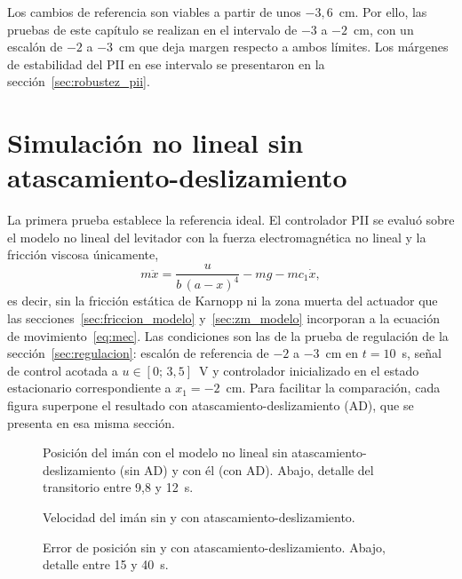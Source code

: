 Los cambios de referencia son viables a partir de unos $-3{,}6$~cm. Por ello, las pruebas de este capítulo se realizan en el intervalo de $-3$ a $-2$~cm, con un escalón de $-2$ a $-3$~cm que deja margen respecto a ambos límites. Los márgenes de estabilidad del PII en ese intervalo se presentaron en la sección~\ref{sec:robustez_pii}.

\section{Simulación no lineal sin atascamiento-deslizamiento}

La primera prueba establece la referencia ideal. El controlador PII se evaluó sobre el modelo no lineal del levitador con la fuerza electromagnética no lineal y la fricción viscosa únicamente,
\begin{equation}
m\ddot{x} = \frac{u}{b\,(a-x)^4} - m g - m c_1 \dot{x} ,
\label{eq:nl_sin_ad}
\end{equation}
es decir, sin la fricción estática de Karnopp ni la zona muerta del actuador que las secciones~\ref{sec:friccion_modelo} y~\ref{sec:zm_modelo} incorporan a la ecuación de movimiento~\eqref{eq:mec}. Las condiciones son las de la prueba de regulación de la sección~\ref{sec:regulacion}: escalón de referencia de $-2$ a $-3$~cm en $t=10$~s, señal de control acotada a $u\in[0;\,3{,}5]$~V y controlador inicializado en el estado estacionario correspondiente a $x_1=-2$~cm. Para facilitar la comparación, cada figura superpone el resultado con atascamiento-deslizamiento (AD), que se presenta en esa misma sección.

\begin{figure}[ht]
    \centering
    
    \caption[Sin AD: posición]{Posición del imán con el modelo no lineal sin atascamiento-deslizamiento (sin AD) y con él (con AD). Abajo, detalle del transitorio entre 9,8 y 12~s.}
    \label{fig:sinad_pos}
\end{figure}

\begin{figure}[ht]
    \centering
    
    \caption[Sin AD: velocidad]{Velocidad del imán sin y con atascamiento-deslizamiento.}
    \label{fig:sinad_vel}
\end{figure}

\begin{figure}[ht]
    \centering
    
    \caption[Sin AD: error]{Error de posición sin y con atascamiento-deslizamiento. Abajo, detalle entre 15 y 40~s.}
    \label{fig:sinad_error}
\end{figure}

